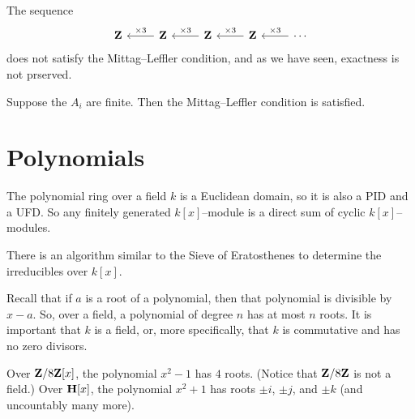 \documentclass[11pt, oneside,margin=1in]{article}
\begin{document}
\begin{example}\label{}
The sequence
\[
\begin{tikzcd}
	\Z & \Z \arrow[l, "\times 3", swap] & \Z \arrow[l, "\times 3", swap] & \Z \arrow[l, "\times 3", swap] & \cdots \arrow[l, "\times 3",swap]
\end{tikzcd}
\]
does not satisfy the Mittag--Leffler condition, and as we have seen, exactness is not prserved.
\end{example}

\begin{example}\label{}
Suppose the $A_i$ are finite. Then the Mittag--Leffler condition is satisfied.
\end{example}

\section{Polynomials}
The polynomial ring over a field $k$ is a Euclidean domain, so it is also a PID and a UFD. So any finitely generated $k[x]$--module is a direct sum of cyclic $k[x]$--modules.

There is an algorithm similar to the Sieve of Eratosthenes to determine the irreducibles over $k[x]$.

Recall that if $a$ is a root of a polynomial, then that polynomial is divisible by $x-a$. So, over a field, a polynomial of degree $n$ has at most $n$ roots. It is important that $k$ is a field, or, more specifically, that $k$ is commutative and has no zero divisors.

\begin{example}\label{}
Over $\mathbf Z / 8\mathbf Z[x]$, the polynomial $x^2-1$ has $4$ roots. (Notice that $\mathbf Z / 8\mathbf Z$ is not a field.) Over $\mathbf H[x]$, the polynomial $x^2 + 1$ has roots $\pm i$, $\pm j$, and $\pm k$ (and uncountably many more).
\end{example}
\end{document}
